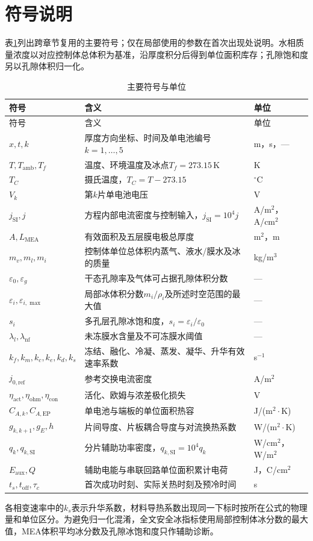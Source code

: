 \documentclass[bwprint]{gmcmthesis}
\numberwithin{equation}{section}
\numberwithin{figure}{section}
\begin{document}
\section{符号说明}
表\ref{tab:main_symbols}列出跨章节复用的主要符号；仅在局部使用的参数在首次出现处说明。水相质量浓度以对应控制体总体积为基准，沿厚度积分后得到单位面积库存；孔隙饱和度另以孔隙体积归一化。
{\small
\begin{longtable}{p{}p{}p{}}
\caption{主要符号与单位}\label{tab:main_symbols}\\
\toprule
符号 & 含义 & 单位\\
\midrule
\endfirsthead
\toprule
符号 & 含义 & 单位\\
\midrule
\endhead
$x,t,k$ & 厚度方向坐标、时间及单电池编号$k=1,\ldots,5$ & m，s，---\\
$T,T_{\mathrm{amb}},T_f$ & 温度、环境温度及冰点$T_f=273.15\,\mathrm K$ & K\\
$T_C$ & 摄氏温度，$T_C=T-273.15$ & $^\circ\mathrm C$\\
$V_k$ & 第$k$片单电池电压 & V\\
$j_{\mathrm{SI}},j$ & 方程内部电流密度与控制输入，$j_{\mathrm{SI}}=10^4j$ & A/m$^2$，A/cm$^2$\\
$A,L_{\mathrm{MEA}}$ & 有效面积及五层膜电极总厚度 & m$^2$，m\\
$m_v,m_l,m_i$ & 控制体单位总体积内蒸气、液水/膜水及冰的质量 & kg/m$^3$\\
$\varepsilon_0,\varepsilon_g$ & 干态孔隙率及气体可占据孔隙体积分数 & ---\\
$\varepsilon_i,\varepsilon_{i,\max}$ & 局部冰体积分数$m_i/\rho_i$及所述时空范围的最大值 & ---\\
$s_i$ & 多孔层孔隙冰饱和度，$s_i=\varepsilon_i/\varepsilon_0$ & ---\\
$\lambda_l,\lambda_{\mathrm{nf}}$ & 未冻膜水含量及不可冻膜水阈值 & ---\\
$k_f,k_m,k_c,k_e,k_d,k_s$ & 冻结、融化、冷凝、蒸发、凝华、升华有效速率系数 & s$^{-1}$\\
$j_{0,\mathrm{ref}}$ & 参考交换电流密度 & A/m$^2$\\
$\eta_{\mathrm{act}},\eta_{\mathrm{ohm}},\eta_{\mathrm{con}}$ & 活化、欧姆与浓差极化损失 & V\\
$C_{A,k},C_{A,\mathrm{EP}}$ & 单电池与端板的单位面积热容 & J/(m$^2\cdot$K)\\
$g_{k,k+1},g_E,h$ & 片间导度、片板耦合导度与对流换热系数 & W/(m$^2\cdot$K)\\
$q_k,q_{k,\mathrm{SI}}$ & 分片辅助功率密度，$q_{k,\mathrm{SI}}=10^4q_k$ & W/cm$^2$，W/m$^2$\\
$E_{\mathrm{aux}},Q$ & 辅助电能与串联回路单位面积累计电荷 & J，C/cm$^2$\\
$t_s,t_{\mathrm{off}},\tau_c$ & 首次成功时刻、实际关热时刻及预冷时间 & s\\
\bottomrule
\end{longtable}}
各相变速率中的$k_s$表示升华系数，材料导热系数出现同一下标时按所在公式的物理量和单位区分。为避免归一化混淆，全文安全冰指标使用局部控制体冰分数的最大值，MEA体积平均冰分数及孔隙冰饱和度只作辅助诊断。
\end{document}
